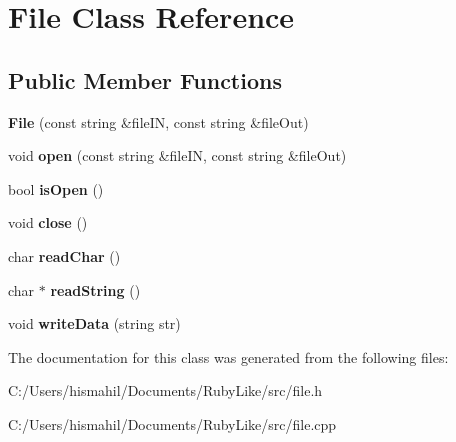 \hypertarget{class_file}{\section{File Class Reference}
\label{class_file}
}
\subsection*{Public Member Functions}
\begin{DoxyCompactItemize}
\item 
\hypertarget{class_file_a1697d4d739c321a2af4097a9d139bd41}{{\bfseries File} (const string \&file\-I\-N, const string \&file\-Out)}\label{class_file_a1697d4d739c321a2af4097a9d139bd41}

\item 
\hypertarget{class_file_af1f5abf490fe288eb4a87ac0da20cc6d}{void {\bfseries open} (const string \&file\-I\-N, const string \&file\-Out)}\label{class_file_af1f5abf490fe288eb4a87ac0da20cc6d}

\item 
\hypertarget{class_file_af6794f27c00b09ee3d5ea65c16de7334}{bool {\bfseries is\-Open} ()}\label{class_file_af6794f27c00b09ee3d5ea65c16de7334}

\item 
\hypertarget{class_file_a83cbce54d6c3b8c2f417b51f6b3f488c}{void {\bfseries close} ()}\label{class_file_a83cbce54d6c3b8c2f417b51f6b3f488c}

\item 
\hypertarget{class_file_a25ace1d32d49ee9c660dd42b77944c64}{char {\bfseries read\-Char} ()}\label{class_file_a25ace1d32d49ee9c660dd42b77944c64}

\item 
\hypertarget{class_file_a30c706c71d33f7e2e2a7869ee4a82a57}{char $\ast$ {\bfseries read\-String} ()}\label{class_file_a30c706c71d33f7e2e2a7869ee4a82a57}

\item 
\hypertarget{class_file_a3c3dbdd8690d93eed7ac83cf7ebe0f7e}{void {\bfseries write\-Data} (string str)}\label{class_file_a3c3dbdd8690d93eed7ac83cf7ebe0f7e}

\end{DoxyCompactItemize}


The documentation for this class was generated from the following files\-:\begin{DoxyCompactItemize}
\item 
C\-:/\-Users/hismahil/\-Documents/\-Ruby\-Like/src/file.\-h\item 
C\-:/\-Users/hismahil/\-Documents/\-Ruby\-Like/src/file.\-cpp\end{DoxyCompactItemize}

